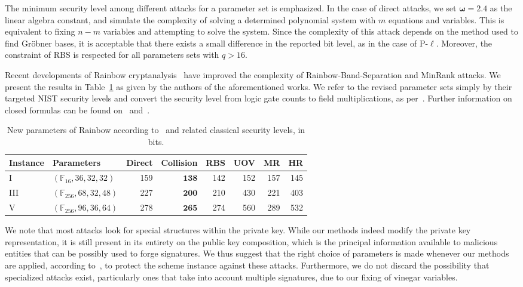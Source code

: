 \documentclass[12pt, a4paper, oneside]{memoir}
\theoremstyle{definition}
\begin{document}
The minimum security level among different attacks for a parameter set is emphasized. In the case of direct attacks, we set $\bm{\omega} = 2.4$ as the linear algebra constant, and simulate the complexity of solving a determined polynomial system with $m$ equations and variables. This is equivalent to fixing $n - m$ variables and attempting to solve the system. Since the complexity of this attack depends on the method used to find Gröbner bases, it is acceptable that there exists a small difference in the reported bit level, as in the case of P-$\ell$. Moreover, the constraint of RBS is respected for all parameters sets with $q > 16$. 

Recent developments of Rainbow cryptanalysis~\cite{Ding:202006} have improved the complexity of Rainbow-Band-Separation and MinRank attacks. We present the results in Table~\ref{tab:newsec} as given by the authors of the aforementioned works. We refer to the revised parameter sets simply by their targeted NIST security levels and convert the security level from logic gate counts to field multiplications, as per~\cite[p.~35]{Ding:201901}. Further information on closed formulas can be found on~\cite[Eq.~19]{Nakamura:202007a} and~\cite[Section~5]{Nakamura:202007b}.

\begin{table}[htbp]
  \centering
  \renewcommand{\arraystretch}{1.2}
  \caption{New parameters of Rainbow according to~\cite[Section 4]{Ding:202006} and related classical security levels, in bits.}\label{tab:newsec}
  \begin{tabular}{*{2}{l}*{6}{r}}
    \toprule
    Instance & Parameters & Direct & Collision & RBS & UOV & MR & HR \\
    \midrule
    I    & $(\mathbb{F}_{ 16}, 36, 32, 32)$  &              159 &  $\mathbf{ 138}$ &              142 &              152 &              157 &              145 \\
    III  & $(\mathbb{F}_{256}, 68, 32, 48)$  &              227 &  $\mathbf{ 200}$ &              210 &              430 &              221 &              403 \\
    V    & $(\mathbb{F}_{256}, 96, 36, 64)$  &              278 &  $\mathbf{ 265}$ &              274 &              560 &              289 &              532 \\
    \bottomrule
  \end{tabular}
\end{table}

We note that most attacks look for special structures within the private key. While our methods indeed modify the private key representation, it is still present in its entirety on the public key composition, which is the principal information available to malicious entities that can be possibly used to forge signatures. We thus suggest that the right choice of parameters is made whenever our methods are applied, according to~\cite{Petzoldt:201005}, to protect the scheme instance against these attacks. Furthermore, we do not discard the possibility that specialized attacks exist, particularly ones that take into account multiple signatures, due to our fixing of vinegar variables. 
\end{document}

